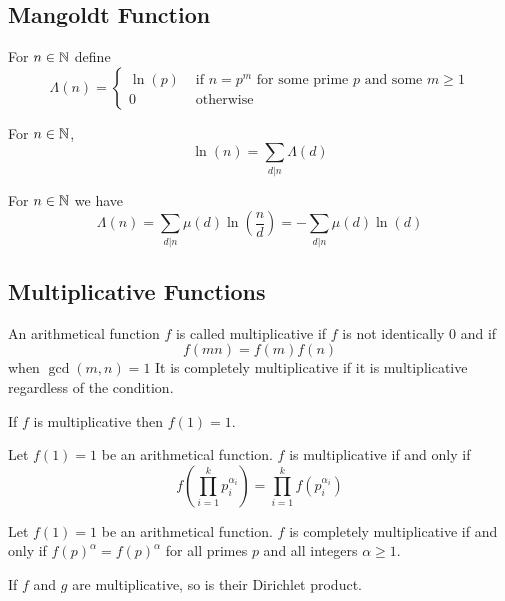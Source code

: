 \documentclass[a4paper]{article}
\begin{document}
\subsection{Mangoldt Function}
\begin{defn} For $n\in\mathbb{N}$ define $$\Lambda(n)=\begin{cases}
\ln(p) & \text{ if } n=p^m \text{ for some prime } p \text{ and some } m\geq 1\\
0 & \text{ otherwise }
\end{cases}$$
\end{defn}

\begin{thm} For $n\in\mathbb{N}$, $$\ln(n)=\sum_{d|n}\Lambda(d)$$
\end{thm}

\begin{thm} For $n\in\mathbb{N}$ we have $$\Lambda(n)=\sum_{d|n}\mu(d)\ln\left(\frac{n}{d}\right)=-\sum_{d|n}\mu(d)\ln(d)$$
\end{thm}

\subsection{Multiplicative Functions}
\begin{defn} An arithmetical function $f$ is called multiplicative if $f$ is not identically $0$ and if $$f(mn)=f(m)f(n)$$ when $\gcd(m,n)=1$ It is completely multiplicative if it is multiplicative regardless of the condition. 
\end{defn}

\begin{prp} If $f$ is multiplicative then $f(1)=1$. 
\end{prp}

\begin{prp} Let $f(1)=1$ be an arithmetical function. $f$ is multiplicative if and only if $$f\left(\prod_{i=1}^kp_i^{\alpha_i}\right)=\prod_{i=1}^kf\left(p_i^{\alpha_i}\right)$$
\end{prp}

\begin{prp} Let $f(1)=1$ be an arithmetical function. $f$ is completely multiplicative if and only if $f(p)^\alpha=f(p)^\alpha$ for all primes $p$ and all integers $\alpha\geq 1$. 
\end{prp}

\begin{prp} If $f$ and $g$ are multiplicative, so is their Dirichlet product. 
\end{prp}
\end{document}
